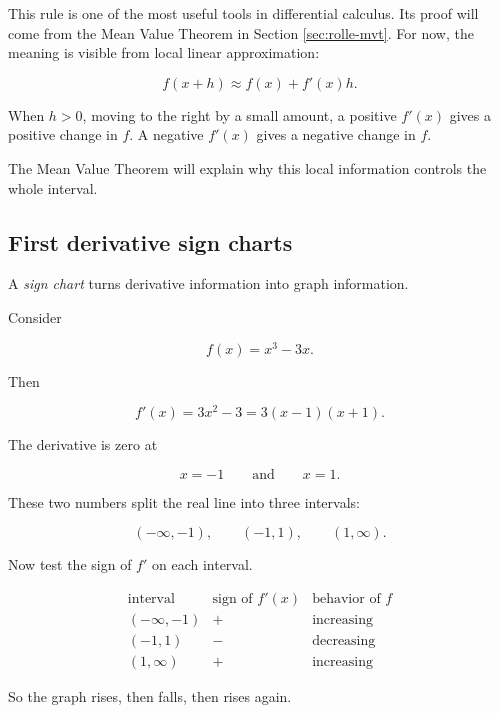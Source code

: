 This rule is one of the most useful tools in differential calculus.  Its proof will
come from the Mean Value Theorem in Section \ref{sec:rolle-mvt}.  For now, the
meaning is visible from local linear approximation:

\[
f(x+h)\approx f(x)+f'(x)h.
\]

When \(h>0\), moving to the right by a small amount, a positive \(f'(x)\) gives a
positive change in \(f\).  A negative \(f'(x)\) gives a negative change in \(f\).

The Mean Value Theorem will explain why this local information controls the
whole interval.

\subsection{First derivative sign charts}
\label{subsec:first-derivative-sign-charts}

A \emph{sign chart} turns derivative information into graph information.

Consider

\[
f(x)=x^3-3x.
\]

Then

\[
f'(x)=3x^2-3=3(x-1)(x+1).
\]

The derivative is zero at

\[
x=-1
\qquad\text{and}\qquad
x=1.
\]

These two numbers split the real line into three intervals:

\[
(-\infty,-1),
\qquad
(-1,1),
\qquad
(1,\infty).
\]

Now test the sign of \(f'\) on each interval.

\[
\begin{array}{c|c|c}
\text{interval} & \text{sign of } f'(x) & \text{behavior of } f \\ \hline
(-\infty,-1) & + & \text{increasing} \\
(-1,1) & - & \text{decreasing} \\
(1,\infty) & + & \text{increasing}
\end{array}
\]

So the graph rises, then falls, then rises again.


